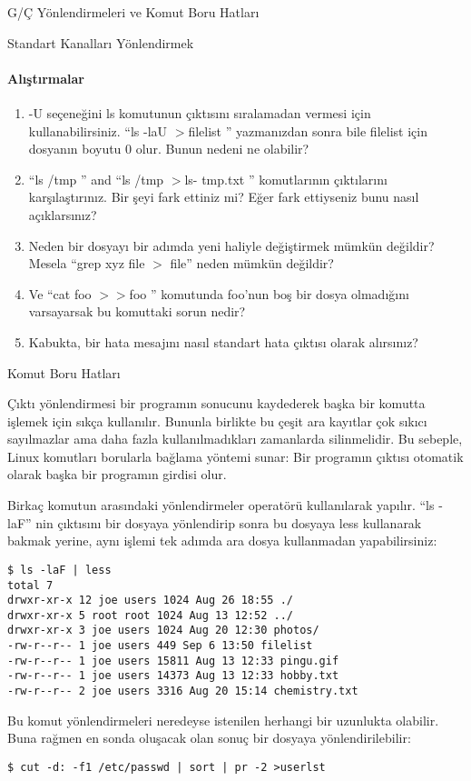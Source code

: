 \begin{section}{G/Ç Yönlendirmeleri ve Komut Boru Hatları}
\begin{subsection}{Standart Kanalları Yönlendirmek}
\paragraph{{\Huge{\PencilLeftDown}}Alıştırmalar}{
\begin{enumerate}
 \item -U seçeneğini ls komutunun çıktısını sıralamadan vermesi için kullanabilirsiniz. “ls -laU $>$filelist ” yazmanızdan sonra bile filelist için dosyanın boyutu 0 olur. Bunun nedeni ne olabilir?
 \item “ls /tmp ” and “ls /tmp $>$ls- tmp.txt ” komutlarının çıktılarını karşılaştırınız. Bir şeyi fark ettiniz mi? Eğer fark ettiyseniz bunu nasıl açıklarsınız? 
 \item Neden bir dosyayı bir adımda yeni haliyle değiştirmek mümkün değildir? Mesela “grep xyz file $>$ file” neden mümkün değildir?
\item Ve “cat foo $>>$foo ” komutunda foo'nun boş bir dosya olmadığını varsayarsak bu komuttaki sorun nedir?
\item Kabukta, bir hata mesajını nasıl standart hata çıktısı olarak alırsınız?
\end{enumerate}}
\end{subsection}
\begin{subsection}{Komut Boru Hatları}

Çıktı yönlendirmesi bir programın sonucunu kaydederek başka bir komutta işlemek için sıkça kullanılır. Bununla birlikte bu çeşit ara kayıtlar çok sıkıcı sayılmazlar ama daha fazla kullanılmadıkları zamanlarda silinmelidir. Bu sebeple, Linux komutları borularla bağlama yöntemi sunar: Bir programın çıktısı otomatik olarak başka bir programın girdisi olur.

Birkaç komutun arasındaki yönlendirmeler \textbar  operatörü kullanılarak yapılır.  “ls -laF” nin çıktısını bir dosyaya yönlendirip sonra bu dosyaya less kullanarak bakmak yerine, aynı işlemi tek adımda ara dosya kullanmadan yapabilirsiniz:
\begin{verbatim}
$ ls -laF | less
total 7
drwxr-xr-x 12 joe users 1024 Aug 26 18:55 ./
drwxr-xr-x 5 root root 1024 Aug 13 12:52 ../
drwxr-xr-x 3 joe users 1024 Aug 20 12:30 photos/
-rw-r--r-- 1 joe users 449 Sep 6 13:50 filelist
-rw-r--r-- 1 joe users 15811 Aug 13 12:33 pingu.gif
-rw-r--r-- 1 joe users 14373 Aug 13 12:33 hobby.txt
-rw-r--r-- 2 joe users 3316 Aug 20 15:14 chemistry.txt
\end{verbatim}

Bu komut yönlendirmeleri neredeyse istenilen herhangi bir uzunlukta olabilir. Buna rağmen en sonda oluşacak olan sonuç bir dosyaya yönlendirilebilir:
\begin{verbatim}
$ cut -d: -f1 /etc/passwd | sort | pr -2 >userlst
\end{verbatim}


\end{subsection}
\end{section}
